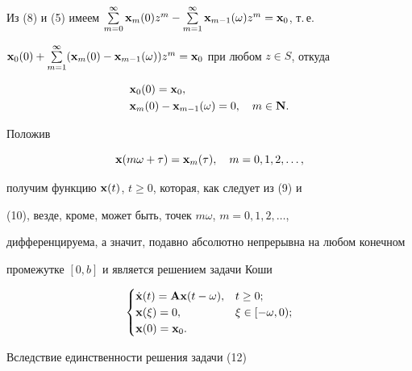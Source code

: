 Из (8) и (5) имеем $\sum\limits^\infty_{m=0}\bold x_m(0)z^m- 


\sum\limits^\infty_{m=1}\bold x_{m-1}(\omega)z^m=\bold x_0$, т.\,е. 


$\bold x_0(0)+\sum\limits^\infty_{m=1}(\bold x_m(0)-\bold 


x_{m-1}(\omega))z^m=\bold x_0$ при любом $z\in S$, откуда 


\begin{equation} 


\begin{split} 


& \bold x_0(0)=\bold x_0,\\ 


& \bold x_m(0)-\bold x_{m-1}(\omega)=0,\quad m\in \bold N. 


\end{split} 


\end{equation} 


Положив 


\begin{equation} 


\bold x(m\omega+\tau)=\bold x_m(\tau),\quad m=0,1,2,\dotsc, 


\end{equation} 


получим функцию $\bold x(t)$, $t\ge0$, которая, как следует из (9) и 


(10), везде, кроме, может быть, точек $m\omega$, $m=0,1,2,\dotsc$, 


дифференцируема, а значит, подавно абсолютно непрерывна на любом конечном 


промежутке $[0,b]$ и является решением задачи Коши 


\begin{equation} 


\begin{cases} 


\Dot{\bold x}(t)=\bold A\bold x(t-\omega), & t\ge0;\\ 


\bold x(\xi)=0, & \xi\in[-\omega,0);\\ 


\bold x(0)=\bold x_0. & \ 


\end{cases} 


\end{equation} 


Вследствие единственности решения задачи (12) 



